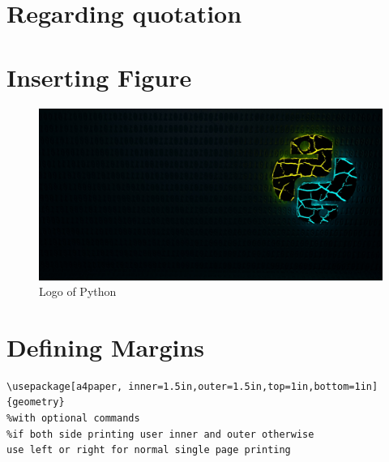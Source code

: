 \documentclass[12pt]{report}
\begin{document}
\section{Regarding quotation}
\begin{quote}
    \lipsum[1]
\end{quote}
\lipsum[1-2]

\noindent\lipsum[3]%
\newpage
\section{Inserting Figure}
\begin{figure}[h]
    \centering
    \includegraphics[width=5in]{python.jpg}
    \caption{Logo of Python}
\end{figure}
\newpage
\section{Defining Margins}
\begin{verbatim}
\usepackage[a4paper, inner=1.5in,outer=1.5in,top=1in,bottom=1in]{geometry}
%with optional commands
%if both side printing user inner and outer otherwise 
use left or right for normal single page printing
\end{verbatim}
\end{document}
